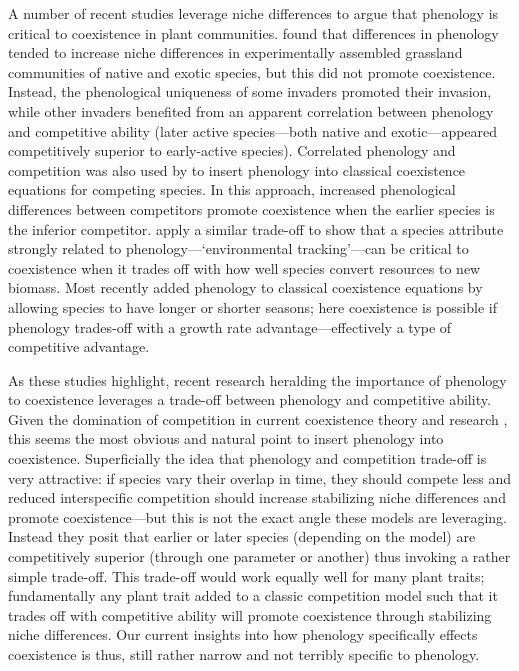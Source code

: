 \documentclass[11pt]{article}
\begin{document}
A number of recent studies leverage niche differences to argue that phenology is critical to coexistence in plant communities. \citet{godoy2014} found that differences in phenology tended to increase niche differences in experimentally assembled grassland communities of native and exotic species, but this did not promote coexistence. Instead, the phenological uniqueness of some invaders promoted their invasion, while other invaders benefited from an apparent correlation between phenology and competitive ability (later active species---both native and exotic---appeared competitively superior to early-active species). Correlated phenology and competition was also used by \citet{rudolf2019role} to insert phenology into classical coexistence equations for competing species. In this approach, increased phenological differences between competitors promote coexistence when the earlier species is the inferior competitor. \citet{wolkovich2021phenological} apply a similar trade-off to show that a species attribute strongly related to phenology---`environmental tracking'---can be critical to coexistence when it trades off with how well species convert resources to new biomass. Most recently \citet{levine2022competition} added phenology to classical coexistence equations by allowing species to have longer or shorter seasons; here coexistence is possible if phenology trades-off with a growth rate advantage---effectively a type of competitive advantage.  

As these studies highlight, recent research heralding the importance of phenology to coexistence leverages a trade-off between phenology and competitive ability. Given the domination of competition in current coexistence theory and research \citep{mcpeek2022coexistence}, this seems the most obvious and natural point to insert phenology into coexistence. Superficially the idea that phenology and competition trade-off is very attractive: if species vary their overlap in time, they should compete less and reduced interspecific competition should increase stabilizing niche differences and promote coexistence---but this is not the exact angle these models are leveraging. Instead they posit that earlier or later species (depending on the model) are competitively superior (through one parameter or another) thus invoking a rather simple trade-off. This trade-off would work equally well for many plant traits; fundamentally any plant trait added to a classic competition model such that it trades off with competitive ability will promote coexistence through stabilizing niche differences. Our current insights into how phenology specifically effects coexistence is thus, still rather narrow and not terribly specific to phenology. 
\end{document}
